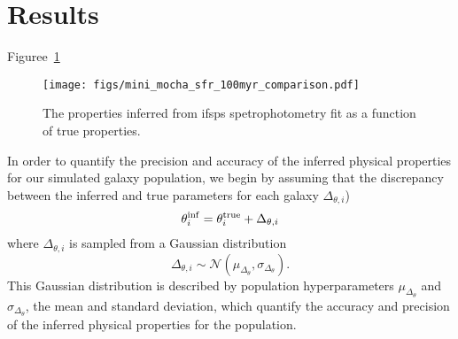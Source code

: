 \section{Results} \label{sec:results}
Figuree~\ref{fig:prop_inf} 

\begin{figure}
\begin{center}
\texttt{[image: figs/mini\_mocha\_sfr\_100myr\_comparison.pdf]} 
\caption{The properties inferred from ifsps spetrophotometry fit as a function of true properties. 
}
\label{fig:prop_inf}
\end{center}
\end{figure}

In order to quantify the precision and accuracy of the inferred physical
properties for our simulated galaxy population, we begin by assuming that the
discrepancy between the inferred and true parameters for each galaxy 
$\Delta_{\theta,i}$) 
\begin{equation}
    \theta^{\rm inf}_i = \theta^{\rm true}_i + \Delta_{\theta,i}
\end{equation}
where $\Delta_{\theta,i}$ is sampled from a Gaussian distribution
\begin{equation}
    \Delta_{\theta,i} \sim \mathcal{N}(\mu_{\Delta_{\theta}}, \sigma_{\Delta_{\theta}}).
\end{equation}
This Gaussian distribution is described by population hyperparameters $\mu_{\Delta_{\theta}}$ and 
$\sigma_{\Delta_{\theta}}$, the mean and standard deviation, which quantify the accuracy and 
precision of the inferred physical properties for the population. 

